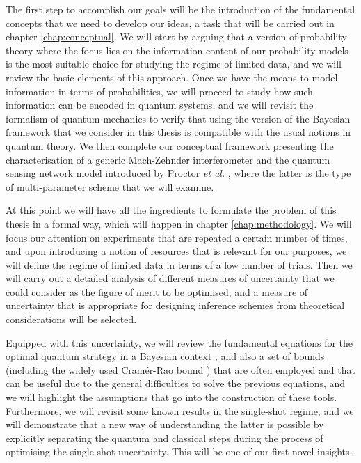 The first step to accomplish our goals will be the introduction of the fundamental concepts that we need to develop our ideas, a task that will be carried out in chapter \ref{chap:conceptual}. We will start by arguing that a version of probability theory where the focus lies on the information content of our probability models is the most suitable choice for studying the regime of limited data, and we will review the basic elements of this approach. Once we have the means to model information in terms of probabilities, we will proceed to study how such information can be encoded in quantum systems, and we will revisit the formalism of quantum mechanics to verify that using the version of the Bayesian framework that we consider in this thesis is compatible with the usual notions in quantum theory. We then complete our conceptual framework presenting the characterisation of a generic Mach-Zehnder interferometer and the quantum sensing network model introduced by Proctor \emph{et al.} \cite{proctor2017networked}, where the latter is the type of multi-parameter scheme that we will examine. 

At this point we will have all the ingredients to formulate the problem of this thesis in a formal way, which will happen in chapter \ref{chap:methodology}. We will focus our attention on experiments that are repeated a certain number of times, and upon introducing a notion of resources that is relevant for our purposes, we will define the regime of limited data in terms of a low number of trials. Then we will carry out a detailed analysis of different measures of uncertainty that we could consider as the figure of merit to be optimised, and a measure of uncertainty that is appropriate for designing inference schemes from theoretical considerations will be selected. 

Equipped with this uncertainty, we will review the fundamental equations for the optimal quantum strategy in a Bayesian context \cite{helstrom1976, helstrom1974, holevo1973b, holevo1973}, and also a set of bounds (including the widely used Cram\'{e}r-Rao bound \cite{paris2009, rafal2015}) that are often employed and that can be useful due to the general difficulties to solve the previous equations, and we will highlight the assumptions that go into the construction of these tools. Furthermore, we will revisit some known results in the single-shot regime, and we will demonstrate that a new way of understanding the latter is possible by explicitly separating the quantum and classical steps during the process of optimising the single-shot uncertainty. This will be one of our first novel insights. 

